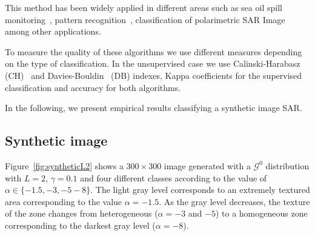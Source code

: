 \documentclass[journal]{IEEEtran}
\begin{document}
This method has been widely applied in different areas such as sea oil spill monitoring~\cite{Fan2015}, pattern recognition~\cite{svmtutorialBURGES1999}, classification of polarimetric SAR Image~\cite{Palacio2019,Zhang2010} among other applications.

To measure the quality of these algorithms we use different measures depending on the type of classification.  In the unsupervised case we use Calinski-Harabasz (CH)~\cite{Calinski1974} and Davies-Bouldin~\cite{Davies1979} (DB) indexes,  Kappa coefficients for the supervised classification and  accuracy for both algorithms. 

In the following, we present empirical results classifying a synthetic image SAR.



\subsection{Synthetic image}
\label{sec:synthetic}

 Figure~\ref{fig:syntheticL2} shows a $300 \times 300$ image generated with a $\mathcal{G}^0$ distribution with $L=2$, $\gamma=0.1$ and four different classes according to the value of $\alpha \in \{-1.5, -3, -5 -8\}$. The light gray level corresponds to an extremely textured area corresponding to the value $\alpha=-1.5$. As the gray level decreases, the texture of the zone changes from heterogeneous ($\alpha=-3$ and $-5$) to a homogeneous zone corresponding to the darkest gray level ($\alpha=-8$). 
\end{document}

